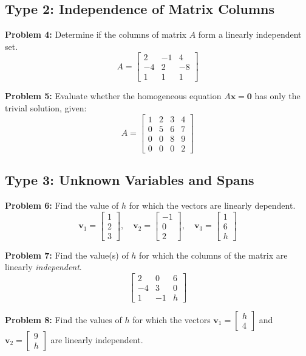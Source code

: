 \documentclass[12pt]{article}
\begin{document}
\subsection*{Type 2: Independence of Matrix Columns}
\textbf{Problem 4:} Determine if the columns of matrix $A$ form a linearly independent set.
$$ A = \begin{bmatrix} 2 & -1 & 4 \\ -4 & 2 & -8 \\ 1 & 1 & 1 \end{bmatrix} $$

\textbf{Problem 5:} Evaluate whether the homogeneous equation $A\mathbf{x} = \mathbf{0}$ has only the trivial solution, given:
$$ A = \begin{bmatrix} 1 & 2 & 3 & 4 \\ 0 & 5 & 6 & 7 \\ 0 & 0 & 8 & 9 \\ 0 & 0 & 0 & 2 \end{bmatrix} $$

\subsection*{Type 3: Unknown Variables and Spans}
\textbf{Problem 6:} Find the value of $h$ for which the vectors are linearly dependent.
$$ \mathbf{v}_1 = \begin{bmatrix} 1 \\ 2 \\ 3 \end{bmatrix}, \quad \mathbf{v}_2 = \begin{bmatrix} -1 \\ 0 \\ 2 \end{bmatrix}, \quad \mathbf{v}_3 = \begin{bmatrix} 1 \\ 6 \\ h \end{bmatrix} $$

\textbf{Problem 7:} Find the value(s) of $h$ for which the columns of the matrix are linearly \textit{independent}.
$$ \begin{bmatrix} 2 & 0 & 6 \\ -4 & 3 & 0 \\ 1 & -1 & h \end{bmatrix} $$

\textbf{Problem 8:} Find the values of $h$ for which the vectors $\mathbf{v}_1 = \begin{bmatrix} h \\ 4 \end{bmatrix}$ and $\mathbf{v}_2 = \begin{bmatrix} 9 \\ h \end{bmatrix}$ are linearly independent. 
\end{document}
